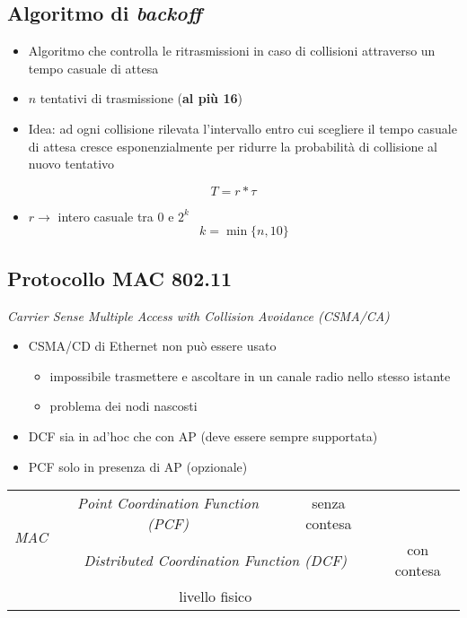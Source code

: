 \documentclass{book}
\begin{document}
\subsection{Algoritmo di \textit{backoff}}
\begin{itemize}
\item Algoritmo che controlla le ritrasmissioni in caso di collisioni
  attraverso un tempo casuale di attesa
\item $n$ tentativi di trasmissione (\textbf{al più 16})
  \item {\color{red} Idea: ad ogni collisione rilevata l’intervallo entro cui scegliere il
tempo casuale di attesa cresce esponenzialmente per ridurre la
probabilità di collisione al nuovo tentativo}
\end{itemize}
\begin{equation}
	T=r*\tau
\end{equation}
\begin{itemize}
\item $r\to$ intero casuale tra 0 e $2^k$
  \begin{equation}
	k=\min\{n,10\}
  \end{equation}  
\end{itemize}
\subsection{Protocollo MAC 802.11}
\textit{Carrier Sense Multiple Access with Collision Avoidance (CSMA/CA)}
\begin{itemize}
\item CSMA/CD di Ethernet non può essere usato
  \begin{itemize}
  \item impossibile trasmettere e ascoltare in un canale radio nello stesso istante
  \item problema dei nodi nascosti
  \end{itemize}
\item DCF sia in ad'hoc che con AP (deve essere sempre supportata)
\item PCF solo in presenza di AP (opzionale)
\end{itemize}
\begin{table}[!h]
  \centering
  \begin{tabular}{c|c|cc}
    \cline{2-2}
    \multirow{2}{*}{\textit{MAC}}&\textit{Point Coordination Function (PCF)}&senza contesa\\
    		\cline{2-3}
    		&\multicolumn{2}{c|}{\textit{Distributed Coordination Function (DCF)}}&con contesa\\
    		\cline{2-3}
    		&\multicolumn{2}{c|}{livello fisico}&\\\cline{2-3}
  \end{tabular}
\end{table}
\end{document}
